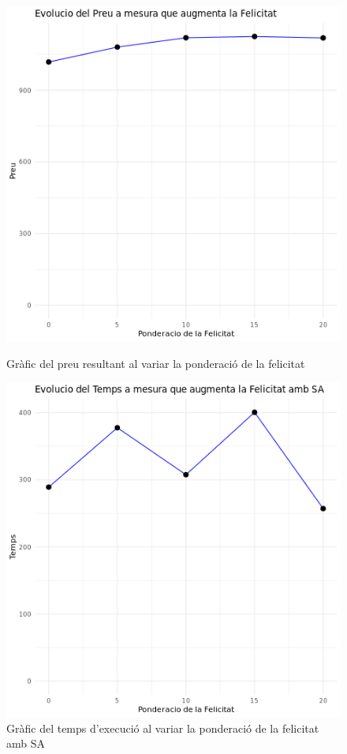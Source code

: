 \documentclass[a4paper]{article}
\begin{document}
	\begin{figure}[H]
		\centering
		\begin{minipage}{0.45\textwidth}
			\centering
			\includegraphics[width=\textwidth]{images/exp7_grafic.png}
			\caption{Gràfic del preu resultant al variar la ponderació de la felicitat}
			\label{fig:exp7_grafic}
		\end{minipage} \hfill
		\begin{minipage}{0.45\textwidth}
			\centering
			\includegraphics[width=\textwidth]{images/exp7b_grafic.png}
			\caption{Gràfic del temps d'execució al variar la ponderació de la felicitat amb SA}
			\label{fig:exp7b_grafic}
		\end{minipage}
	\end{figure}
	
\end{document}
